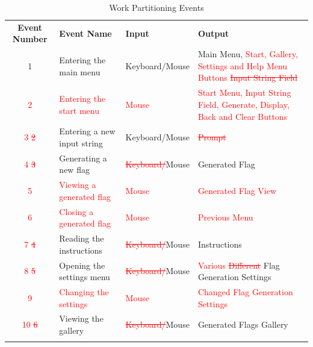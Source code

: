 \documentclass[12pt, titlepage]{article}
\begin{document}
\begin{table}[h!]
    \centering
    \caption{Work Partitioning Events}
    \begin{tabularx}{\textwidth}{|c|X|X|X|}
        \hhline{|-|-|-|-|}
        \textbf{Event Number} & \textbf{Event Name} & \textbf{Input} & \textbf{Output} \\
        \hhline{|-|-|-|-|}
        1 & Entering the main menu & Keyboard/Mouse & Main Menu, \textcolor{red}{Start, Gallery, Settings and Help Menu Buttons \sout{Input String Field}} \\
        \hhline{|-|-|-|-|}
        \textcolor{red}{2} & \textcolor{red}{Entering the start menu} & \textcolor{red}{Mouse} & \textcolor{red}{Start Menu, Input String Field, Generate, Display, Back and Clear Buttons} \\
        \hhline{|-|-|-|-|}
        \textcolor{red}{3 \sout{2}} & Entering a new input string & Keyboard/Mouse & \textcolor{red}{\sout{Prompt}} \\
        \hhline{|-|-|-|-|}
        \textcolor{red}{4 \sout{3}} & Generating a new flag & \textcolor{red}{\sout{Keyboard/}}Mouse & Generated Flag \\
        \hhline{|-|-|-|-|}
        \textcolor{red}{5} & \textcolor{red}{Viewing a generated flag} & \textcolor{red}{Mouse} & \textcolor{red}{Generated Flag View} \\
        \hhline{|-|-|-|-|}
        \textcolor{red}{6} & \textcolor{red}{Closing a generated flag} & \textcolor{red}{Mouse} & \textcolor{red}{Previous Menu} \\
        \hhline{|-|-|-|-|}
        \textcolor{red}{7 \sout{4}} & Reading the instructions & \textcolor{red}{\sout{Keyboard/}}Mouse & Instructions \\
        \hhline{|-|-|-|-|}
        \textcolor{red}{8 \sout{5}} & Opening the settings menu & \textcolor{red}{\sout{Keyboard/}}Mouse & \textcolor{red}{Various \sout{Different}} Flag Generation Settings \\
        \hhline{|-|-|-|-|}
        \textcolor{red}{9} & \textcolor{red}{Changing the settings} & \textcolor{red}{Mouse} & \textcolor{red}{Changed Flag Generation Settings} \\
        \hhline{|-|-|-|-|}
        \textcolor{red}{10 \sout{6}} & Viewing the gallery & \textcolor{red}{\sout{Keyboard/}}Mouse & Generated Flags Gallery \\
        \hhline{|-|-|-|-|}
    \end{tabularx}
\end{table}
\end{document}
